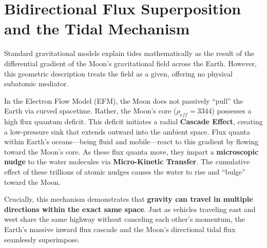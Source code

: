 \documentclass[11pt, a4paper]{article}
\begin{document}
\clearpage
\section{Bidirectional Flux Superposition and the Tidal Mechanism}

Standard gravitational models explain tides mathematically as the result of the differential gradient of the Moon's gravitational field across the Earth. However, this geometric description treats the field as a given, offering no physical subatomic mediator. 

In the Electron Flow Model (EFM), the Moon does not passively ``pull'' the Earth via curved spacetime. Rather, the Moon's core ($\rho_{eff} = 3344$) possesses a high flux quantum deficit. This deficit initiates a radial \textbf{Cascade Effect}, creating a low-pressure sink that extends outward into the ambient space. Flux quanta within Earth's oceans—being fluid and mobile—react to this gradient by flowing toward the Moon's core. As these flux quanta move, they impart a \textbf{microscopic nudge} to the water molecules via \textbf{Micro-Kinetic Transfer}. The cumulative effect of these trillions of atomic nudges causes the water to rise and ``bulge'' toward the Moon.

Crucially, this mechanism demonstrates that \textbf{gravity can travel in multiple directions within the exact same space}. Just as vehicles traveling east and west share the same highway without canceling each other's momentum, the Earth's massive inward flux cascade and the Moon's directional tidal flux seamlessly superimpose.
\end{document}
